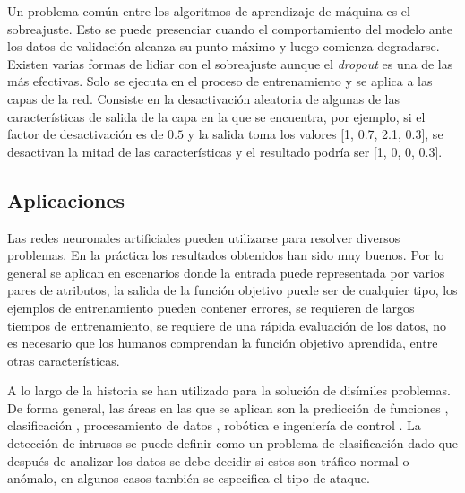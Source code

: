 Un problema común entre los algoritmos de aprendizaje de máquina es el sobreajuste. Esto se puede presenciar cuando el comportamiento del modelo ante los datos de validación alcanza su punto máximo y luego comienza degradarse. Existen varias formas de lidiar con el sobreajuste aunque el \textit{dropout} es una de las más efectivas. Solo se ejecuta en el proceso de entrenamiento y se aplica a las capas de la red. Consiste en la desactivaci\'on aleatoria de algunas de las características de salida de la capa en la que se encuentra, por ejemplo, si el factor de desactivaci\'on es de $0.5$ y la salida toma los valores [1, 0.7, 2.1,  0.3], se desactivan la mitad de las características y el resultado podría ser [1, 0, 0, 0.3].

\subsection{Aplicaciones}

Las redes neuronales artificiales pueden utilizarse para resolver diversos problemas. En la práctica los resultados obtenidos han sido muy buenos. Por lo general se aplican en escenarios donde la entrada puede representada por varios pares de atributos, la salida de la función objetivo puede ser de cualquier tipo, los ejemplos de entrenamiento pueden contener errores, se requieren de largos tiempos de entrenamiento, se requiere de una rápida evaluación de los datos, no es necesario que los humanos comprendan la función objetivo aprendida, entre otras características.

A lo largo de la historia se han utilizado para la solución de disímiles problemas. De forma general, las áreas en las que se aplican son la predicción de funciones \cite{naccha2012prediction}, clasificación \cite{lecun1995comparison}, procesamiento de datos \cite{montano2017redes}, robótica \cite{madrigal2002robots} e ingeniería de control \cite{forero2013control}. La detección de intrusos se puede definir como un problema de clasificación dado que después de analizar los datos se debe decidir si estos son tráfico normal o anómalo, en algunos casos también se especifica el tipo de ataque. 


